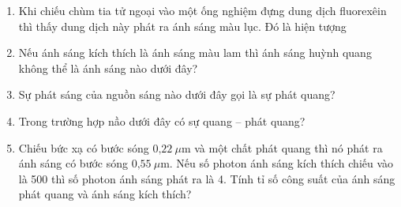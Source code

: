 \begin{enumerate}
	\item Khi chiếu chùm tia tử ngoại vào một ống nghiệm đựng dung dịch fluorexêin thì thấy dung dịch này phát ra ánh sáng màu lục. Đó là hiện tượng
	
	\item Nếu ánh sáng kích thích là ánh sáng màu lam thì ánh sáng huỳnh quang không thể là ánh sáng nào dưới đây?
	
	\item Sự phát sáng của nguồn sáng nào dưới đây gọi là sự phát quang?
	
	\item Trong trường hợp nầo dưới đây có sự quang – phát quang?
	
	\item  Chiếu bức xạ có bước sóng $\text{0,22}\ \mu\text{m}$ và một chất phát quang thì nó phát ra ánh sáng có bước sóng $\text{0,55}\ \mu\text{m}$.
	Nếu số photon ánh sáng kích thích chiếu vào là 500 thì số photon ánh sáng phát ra là 4. Tính tỉ số công suất của ánh sáng phát quang và ánh sáng kích thích?
	

\end{enumerate}
